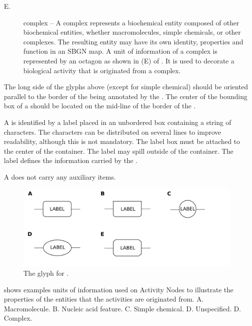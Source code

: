 \begin{glyphDescription}
\begin{description}
\item[E.] complex -- A complex represents a biochemical entity composed of other biochemical entities, whether macromolecules, simple chemicals, or other complexes. The resulting entity may 
have its own identity, properties and function in an SBGN map. A unit of information of a complex is represented by an octagon as shown in (E) of .  It is used to decorate a biological activity that is originated from a complex.
\end{description}

The long side of the glyphs above (except for simple chemical) should be oriented parallel to the border of the  being annotated by the . The center of the bounding box of a  should be located on the mid-line of the border of the .

\glyphLabel A  is identified by a label placed in an unbordered box containing a string of characters. The characters can be distributed on several lines to improve readability, although this is not mandatory.  The label box must be attached to the center of the container. The label may spill outside of the container.  The label defines the information carried by the .

\glyphAux A  does not carry any auxiliary items.

\end{glyphDescription}

\begin{figure}[H]
  \centering
  \includegraphics[scale = 0.2]{images/unitInformation}
  \caption{The \AF glyph for .}
  \label{fig:af:unitInfo}
\end{figure}

 shows examples units of information used on Activity Nodes to illustrate the properties of the entities that the activities are originated from.  A.  Macromolecule.  B.  Nucleic acid feature.  C.  Simple chemical.  D.  Unspecified.  D.  Complex.

